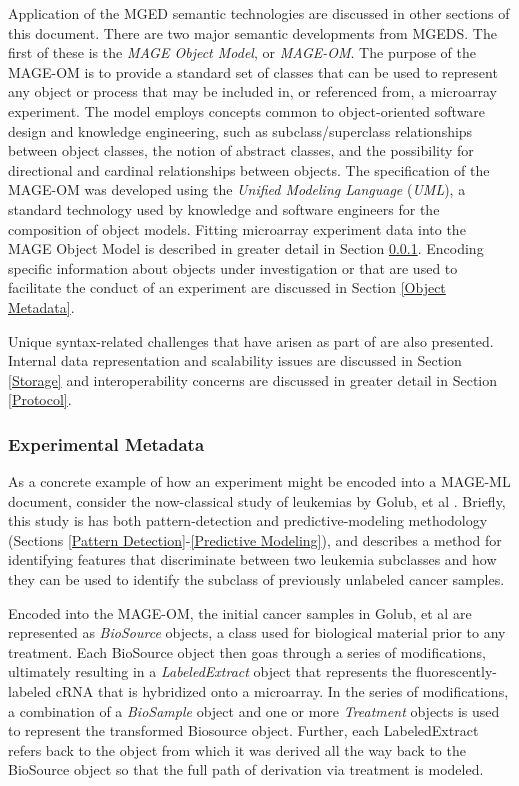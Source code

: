 Application of the MGED semantic technologies are discussed in other sections
of this document.  There are two major semantic developments from MGEDS.  The
first of these is the \emph{MAGE Object Model}, or \emph{MAGE-OM}.  The purpose
of the MAGE-OM is to provide a standard set of classes that can be used to
represent any object or process that may be included in, or referenced from, a
microarray experiment.  The model employs concepts common to object-oriented
software design and knowledge engineering, such as subclass/superclass
relationships between object classes, the notion of abstract classes, and the
possibility for directional and cardinal relationships between objects.  The
specification of the MAGE-OM was developed using the \emph{Unified Modeling
Language} (\emph{UML}), a standard technology used by knowledge and software
engineers for the composition of object models.  Fitting microarray experiment
data into the MAGE Object Model is described in greater detail in Section
\ref{Experimental Metadata}.  Encoding specific information about objects under
investigation or that are used to facilitate the conduct of an experiment are
discussed in Section \ref{Object Metadata}.

Unique syntax-related challenges that have arisen as part of \dbthesis are
also presented.  Internal data representation and scalability issues are
discussed in Section \ref{Storage} and interoperability concerns are discussed in
greater detail in Section \ref{Protocol}.

\subsubsection{Experimental Metadata}
\label{Experimental Metadata}

As a concrete example of how an experiment might be encoded into a MAGE-ML
document, consider the now-classical study of leukemias by Golub, et al
\cite{golub}.  Briefly, this study is has both pattern-detection and
predictive-modeling methodology (Sections \ref{Pattern
Detection}-\ref{Predictive Modeling}), and describes a method for identifying
features that discriminate between two leukemia subclasses and how they can be
used to identify the subclass of previously unlabeled cancer samples.

Encoded into the MAGE-OM, the initial cancer samples in Golub, et al
\cite{golub} are represented as \emph{BioSource} objects, a class used for
biological material prior to any treatment.  Each BioSource object then goas
through a series of modifications, ultimately resulting in a
\emph{LabeledExtract} object that represents the fluorescently-labeled cRNA
that is hybridized onto a microarray.  In the series of modifications, a
combination of a \emph{BioSample} object and one or more \emph{Treatment}
objects is used to represent the transformed Biosource object.  Further, each
LabeledExtract refers back to the object from which it was derived all the way
back to the BioSource object so that the full path of derivation via treatment
is modeled.

